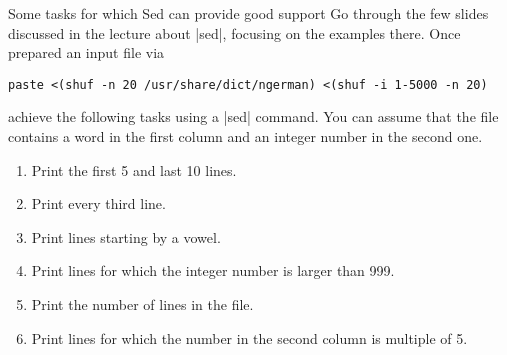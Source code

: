 
\begin{exercise}[Instructive]{Some tasks for which Sed can provide good support}
    Go through the few slides discussed in the lecture about \bash|sed|, focusing on the examples there.
    Once prepared an input file via
    \begin{lstlisting}[style=MyBash]
        paste <(shuf -n 20 /usr/share/dict/ngerman) <(shuf -i 1-5000 -n 20)
    \end{lstlisting}
    achieve the following tasks using a \bash|sed| command.
    You can assume that the file contains a word in the first column and an integer number in the second one.
    \begin{enumerate}
        \item Print the first 5 and last 10 lines.
        \item Print every third line.
        \item Print lines starting by a vowel.
        \item Print lines for which the integer number is larger than 999.
        \item Print the number of lines in the file.
        \item Print lines for which the number in the second column is multiple of 5.
    \end{enumerate}
\end{exercise}
